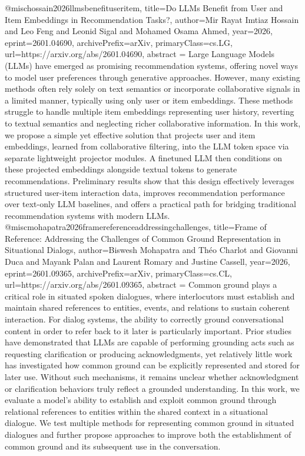 {}@misc{hossain2026llmsbenefituseritem,
      title={Do LLMs Benefit from User and Item Embeddings in Recommendation Tasks?}, 
      author={Mir Rayat Imtiaz Hossain and Leo Feng and Leonid Sigal and Mohamed Osama Ahmed},
      year={2026},
      eprint={2601.04690},
      archivePrefix={arXiv},
      primaryClass={cs.LG},
      url={https://arxiv.org/abs/2601.04690},
      abstract = {Large Language Models (LLMs) have emerged as promising recommendation systems, offering novel ways to model user preferences through generative approaches. However, many existing methods often rely solely on text semantics or incorporate collaborative signals in a limited manner, typically using only user or item embeddings. These methods struggle to handle multiple item embeddings representing user history, reverting to textual semantics and neglecting richer collaborative information. In this work, we propose a simple yet effective solution that projects user and item embeddings, learned from collaborative filtering, into the LLM token space via separate lightweight projector modules. A finetuned LLM then conditions on these projected embeddings alongside textual tokens to generate recommendations. Preliminary results show that this design effectively leverages structured user-item interaction data, improves recommendation performance over text-only LLM baselines, and offers a practical path for bridging traditional recommendation systems with modern LLMs.}
}@misc{mohapatra2026framereferenceaddressingchallenges,
      title={Frame of Reference: Addressing the Challenges of Common Ground Representation in Situational Dialogs}, 
      author={Biswesh Mohapatra and Théo Charlot and Giovanni Duca and Mayank Palan and Laurent Romary and Justine Cassell},
      year={2026},
      eprint={2601.09365},
      archivePrefix={arXiv},
      primaryClass={cs.CL},
      url={https://arxiv.org/abs/2601.09365},
      abstract = {Common ground plays a critical role in situated spoken dialogues, where interlocutors must establish and maintain shared references to entities, events, and relations to sustain coherent interaction. For dialog systems, the ability to correctly ground conversational content in order to refer back to it later is particularly important. Prior studies have demonstrated that LLMs are capable of performing grounding acts such as requesting clarification or producing acknowledgments, yet relatively little work has investigated how common ground can be explicitly represented and stored for later use. Without such mechanisms, it remains unclear whether acknowledgment or clarification behaviors truly reflect a grounded understanding. In this work, we evaluate a model's ability to establish and exploit common ground through relational references to entities within the shared context in a situational dialogue. We test multiple methods for representing common ground in situated dialogues and further propose approaches to improve both the establishment of common ground and its subsequent use in the conversation.}
}
